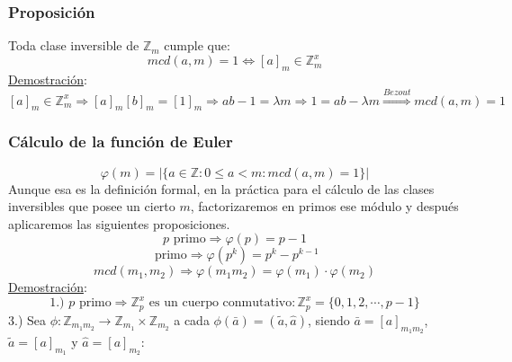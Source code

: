 \documentclass[10pt,a4paper,openright]{book}
\theoremstyle{break}
\begin{document}
\subsubsection*{Proposición}
Toda clase inversible de $\mathbb Z_m$ cumple que:
$$mcd(a,m)=1 \Leftrightarrow [a]_m\in \mathbb Z_m^x$$
\underline{Demostración}:
$$[a]_m\in \mathbb Z_m^x \Rightarrow [a]_m[b]_m=[1]_m\Rightarrow ab-1=\lambda m\Rightarrow 1=ab-\lambda m\stackrel{Bezout}{\Rightarrow }mcd(a,m)=1$$

\subsubsection*{Cálculo de la función de Euler}
$$\varphi(m)=|\{a\in \mathbb Z : 0\leq a<m : mcd(a,m)=1\}|$$
Aunque esa es la definición formal, en la práctica para el cálculo de las clases inversibles que posee un cierto $m$, factorizaremos en primos ese módulo y después aplicaremos las siguientes proposiciones.\begin{equation}p \mbox{ primo} \Rightarrow \varphi(p)=p-1
\end{equation}
\begin{equation}\mbox{ primo} \Rightarrow \varphi(p^k)=p^k-p^{k-1}
\end{equation}
\begin{equation}mcd(m_1,m_2)\Rightarrow \varphi(m_1m_2)=\varphi(m_1)\cdot \varphi(m_2)
\end{equation}
\underline{Demostración}:
$$\mbox{1.) }
p \mbox{ primo} \Rightarrow \mathbb Z_p^x\mbox{ es un cuerpo conmutativo} : \mathbb Z_p^x=\{0,1,2,\cdots,p-1\}$$
\vspace{0.25cm}
3.) Sea $\phi: \mathbb Z_{m_1m_2}\rightarrow \mathbb Z_{m_1} \times \mathbb Z_{m_2}$ a cada $\phi(\bar{a})=(\tilde{a},\hat{a})$, siendo $\bar{a}=[a]_{m_1m_2}$, $\tilde{a}=[a]_{m_1}$ y $\hat{a}=[a]_{m_2}$:
\end{document}
